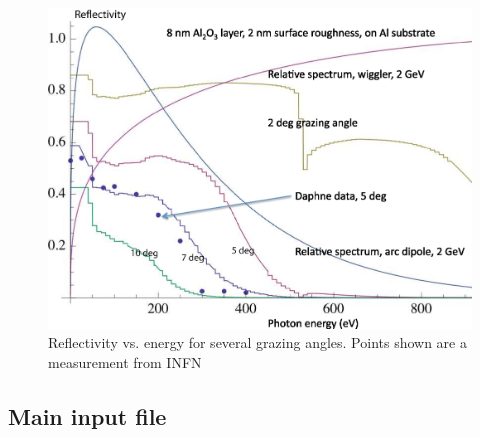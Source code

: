 \documentclass[11pt]{article}
\begin{document}
\begin{figure}[tb]
\begin{center}
\includegraphics[width=5in]{reflectivity.eps}
\caption{Reflectivity vs. energy for several grazing angles. 
Points shown are a measurement from INFN~\cite{b.mehne}}
\label{f:reflect}
\end{center}
\end{figure}

\subsection{Main input file} 
\label{s:main.file}
\end{document}
